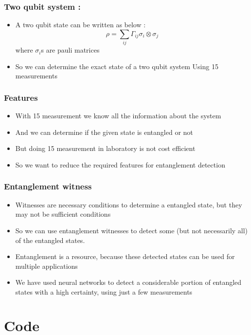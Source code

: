 \documentclass[11pt]{beamer}
\begin{document}
\begin{frame}
\frametitle{Two qubit system :}

\begin{itemize}
 \item  A two qubit state can be written as below : 
  $$ \rho = \sum_{ij} \Gamma_{ij} \sigma_i \otimes \sigma_j$$
  where $\sigma_i$s are pauli matrices
 \item  So we can determine the exact state of a two qubit system Using 15 measurements
\end{itemize}

\end{frame}

\begin{frame}
\frametitle{Features}

\begin{itemize}
 \item  With 15 measurement we know all the information about the system
 \item  And we can determine if the given state is entangled or not
 \item  But doing 15 measurement in laboratory is not cost efficient
 \item  So we want to reduce the required features for entanglement detection
\end{itemize}

\end{frame}

\begin{frame}
\frametitle{Entanglement witness}

\begin{itemize}
 \item Witnesses are necessary conditions to determine a entangled state, but they may not be sufficient conditions
 \item So we can use entanglement witnesses to detect some (but not necessarily all) of the entangled states.
 \item  Entanglement is a resource, because these detected states can be used for multiple applications 
 \item We have used neural networks to detect a considerable portion of entangled states with a high certainty, using just a few measurements
\end{itemize}

\end{frame}






\section{Code}

\end{document}
